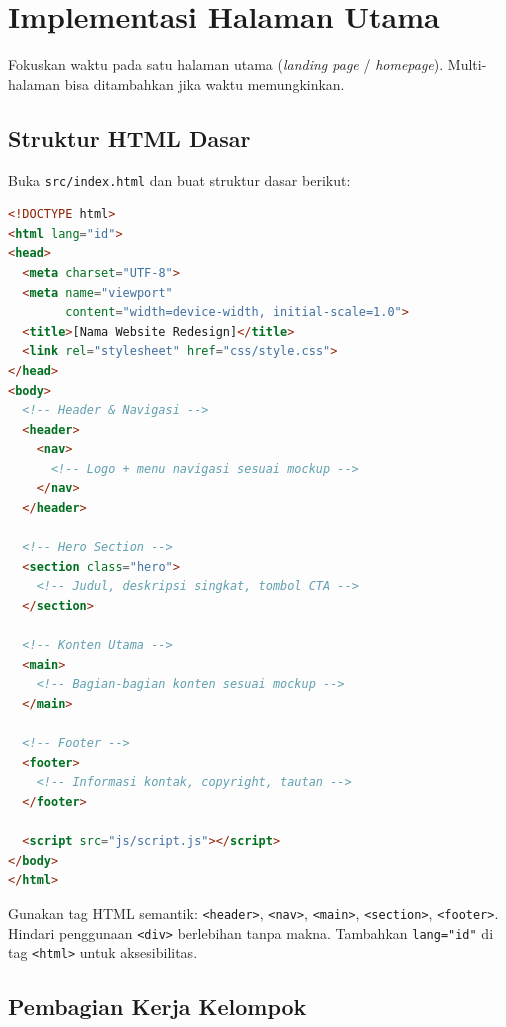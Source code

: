 \section{Implementasi Halaman Utama}
\label{sec:implementasi}

Fokuskan waktu pada satu halaman utama (\emph{landing page} / \emph{homepage}). Multi-halaman bisa ditambahkan jika waktu memungkinkan.

\subsection{Struktur HTML Dasar}
\label{subsec:html-dasar}

Buka \texttt{src/index.html} dan buat struktur dasar berikut:

\begin{lstlisting}[language=HTML, caption={Struktur dasar HTML semantik}, label={lst:html-struktur}]
<!DOCTYPE html>
<html lang="id">
<head>
  <meta charset="UTF-8">
  <meta name="viewport"
        content="width=device-width, initial-scale=1.0">
  <title>[Nama Website Redesign]</title>
  <link rel="stylesheet" href="css/style.css">
</head>
<body>
  <!-- Header & Navigasi -->
  <header>
    <nav>
      <!-- Logo + menu navigasi sesuai mockup -->
    </nav>
  </header>

  <!-- Hero Section -->
  <section class="hero">
    <!-- Judul, deskripsi singkat, tombol CTA -->
  </section>

  <!-- Konten Utama -->
  <main>
    <!-- Bagian-bagian konten sesuai mockup -->
  </main>

  <!-- Footer -->
  <footer>
    <!-- Informasi kontak, copyright, tautan -->
  </footer>

  <script src="js/script.js"></script>
</body>
</html>
\end{lstlisting}

\begin{tip}
Gunakan tag HTML semantik: \texttt{<header>}, \texttt{<nav>}, \texttt{<main>}, \texttt{<section>}, \texttt{<footer>}. Hindari penggunaan \texttt{<div>} berlebihan tanpa makna. Tambahkan \texttt{lang="id"} di tag \texttt{<html>} untuk aksesibilitas.
\end{tip}

\subsection{Pembagian Kerja Kelompok}
\label{subsec:pembagian-kerja}

